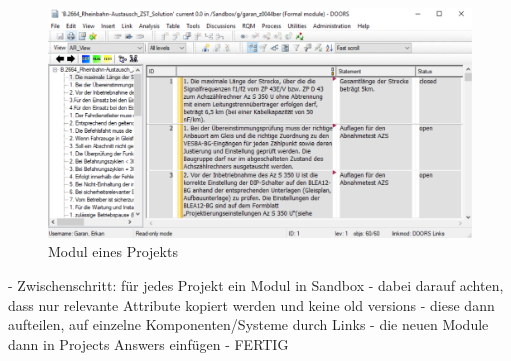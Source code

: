 \begin{figure}[H]
    \centering
    \includegraphics[width = \textwidth]{abbildungen/Solutions.PNG}
    \caption{Modul eines Projekts}
    \label{fig:SolutionsModul}
\end{figure}




- Zwischenschritt: für jedes Projekt ein Modul in Sandbox
- dabei darauf achten, dass nur relevante Attribute kopiert werden und keine old versions
- diese dann aufteilen, auf einzelne Komponenten/Systeme durch Links
- die neuen Module dann in Projects Answers einfügen
- FERTIG